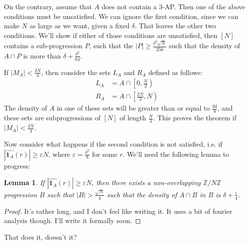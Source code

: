 \documentclass{article}
\newtheorem{lem}[thm]{Lemma}
\theoremstyle{definition}
\newcommand{\znz}{\mathbb{Z}/N\mathbb{Z}}
\newcommand{\indi}{\mathbf{1}_A}
\newcommand{\vep}{\varepsilon}
\begin{document}
On the contrary, assume that $A$ does not contain a 3-AP. Then one of the above conditions must be unsatisfied. We can ignore the first condition, since we can make $N$ as large as we want, given a fixed $\delta$. That leaves the other two conditions. We'll show if either of those conditions are unsatisfied, then $[N]$ contains a sub-progression $P$, such that the $|P| \geq \frac{\delta^2 \sqrt{N}}{256}$ such that the density of $A \cap P$ is more than $\delta + \frac{\delta^2}{64}$.

If $|M_A| < \frac{\delta N}{4}$, then consider the sets $L_A$ and $R_A$ defined as follows:
\begin{align*}
    L_A &= A \cap \left[ 0, \frac{N}{3} \right) \\
    R_A &= A \cap \left[ \frac{2N}{3}, N \right)
\end{align*}
The density of $A$ in one of these sets will be greater than or equal to $\frac{9\delta}{8}$, and these sets are subprogressions of $[N]$ of length $\frac{N}{3}$. This proves the theorem if $|M_A| < \frac{\delta N}{4}$.

Now consider what happens if the second condition is not satisfied, i.e. if $|\widehat{\indi}(r)| \geq \vep N$, where $\vep = \frac{\delta^2}{8}$ for some $r$. We'll need the following lemma to progress:
\begin{lem}
    If $|\widehat{\indi}(r)| \geq \vep N$, then there exists a non-overlapping $\znz$ progression $B$ such that $|B| > \frac{\sqrt{N}}{4}$ such that the density of $A \cap B$ in $B$ is $\delta + \frac{\vep}{4}$. 
\end{lem}

\begin{proof}
    It's rather long, and I don't feel like writing it. It uses a bit of fourier analysis though. I'll write it formally soon.
\end{proof}

That does it, doesn't it?
\end{document}
